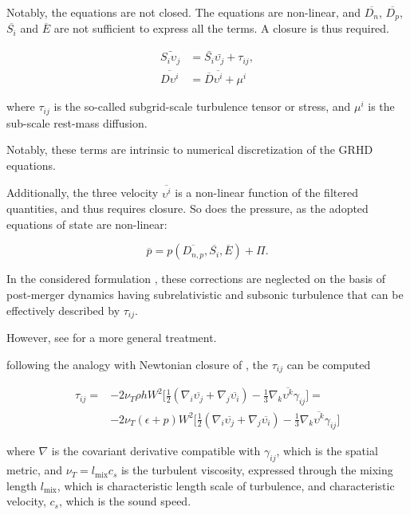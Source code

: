 \documentclass[11pt,a4paper,headinclude=true,DIV=14,BCOR=8mm,chapterprefix,listof=totoc,twoside,openright,abstracton]{scrbook}
\begin{document}
Notably, the equations are not closed. 
The equations are non-linear, and $\overline{D_{n}}$, $\overline{D_p}$, $\overline{S_i}$ and $\overline{E}$ are not sufficient to express all the terms.
A closure is thus required.

\begin{eqnarray}
\bar{S_i\upsilon_j} &= \bar{S_i}\bar{\upsilon_j} + \tau_{ij}, \\
\overline{D\upsilon^i} &= \overline{D}\overline{\upsilon^i} + \mu^i
\end{eqnarray}

where $\tau_{ij}$ is the so-called subgrid-scale turbulence tensor \cite{Radice:2017zta} or stress,
and $\mu^i$ is the sub-scale rest-mass diffusion.

Notably, these terms are intrinsic to numerical discretization of the GRHD equations. 

Additionally, the three velocity $\overline{\upsilon^i}$ is a non-linear function of the filtered quantities, and thus requires closure. So does the pressure, as the adopted equations of state are non-linear:

\begin{equation}
\overline{p} = p(\overline{D_{n,p}},\overline{S_i},\overline{E}) + \Pi.
\end{equation}

In the considered formulation \cite{Radice:2020ids}, these corrections are neglected on the basis of post-merger dynamics having subrelativistic and subsonic turbulence that can be effectively described by $\tau_{ij}$.

However, see \cite{Carrasco:2019uzl,Vigano:2020ouc} for a more general treatment.

following the analogy with Newtonian closure of \cite{Smagorinsky:1963}, the $\tau_{ij}$ can be computed \cite{Radice:2017zta}

\begin{align}
\tau_{ij} = &-2\nu_T\rho h W^2\Big[ \frac{1}{2}(\nabla_i\overline{\upsilon_j} + \nabla_j\overline{\upsilon_i}) - \frac{1}{3}\nabla_k\overline{\upsilon^k}\gamma_{ij} \Big] = \\
&-2 \nu_T (\epsilon + p)W^2\Big[ \frac{1}{2} (\nabla_i\overline{\upsilon_j} + \nabla_j\overline{\upsilon_i}) - \frac{1}{3}\nabla_k\overline{\upsilon^k}\gamma_{ij} \Big]
\end{align}

where $\nabla$ is the covariant derivative compatible with $\gamma_{ij}$, which is the spatial metric, and $\nu_T = l_{\text{mix}}c_s$ is the turbulent viscosity, expressed through the mixing length $l_{\text{mix}}$, which is characteristic length scale of turbulence, and characteristic velocity, $c_s$, which is the sound speed.
\end{document}
